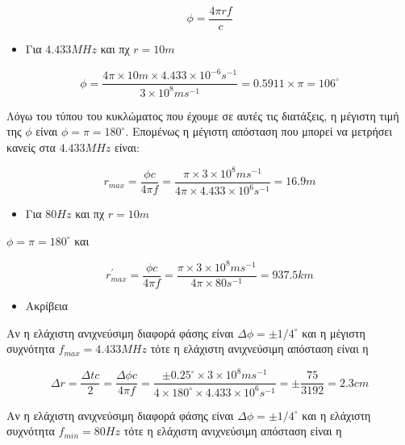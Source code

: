 \documentclass[a4paper,11pt,titlepage]{article}
\newcommand{\degrees}{^{\circ}}
\begin{document}
\begin{equation}
 \phi= \frac{4\pi rf}{c}
\end{equation}

\begin{itemize}
 \item Για $4.433MHz$ και πχ $r=10m$
\end{itemize}

\begin{equation}
 \phi=\frac{4\pi \times10m \times 4.433\times10^{-6}s^{-1}}{3\times10^8ms^{-1}}=0.5911\times\pi=106\degrees
\end{equation}

Λόγω του τύπου του κυκλώματος που έχουμε σε αυτές τις διατάξεις, η μέγιστη τιμή της $\phi$ είναι $\phi=\pi=180\degrees$. Επομένως η μέγιστη απόσταση που μπορεί να μετρήσει κανείς στα $4.433MHz$ είναι:

\begin{equation}
 r_{max}=\frac{\phi c}{4\pi f}=\frac{\pi\times 3\times10^8ms^{-1}}{4\pi\times 4.433\times10^{6} s^{-1}}=16.9m
\end{equation}

\begin{itemize}
 \item Για $80Hz$ και πχ $r=10m$
\end{itemize}

$\phi=\pi=180\degrees$ και 

\begin{equation}
 r^{'}_{max}=\frac{\phi c}{4\pi f}=\frac{\pi\times 3\times10^8ms^{-1}}{4\pi\times 80s^{-1}}=937.5 km
\end{equation}

\begin{itemize}
 \item Ακρίβεια
\end{itemize}

Αν η ελάχιστη ανιχνεύσιμη διαφορά φάσης είναι $\Delta\phi=\pm1/4\degrees$ και η μέγιστη συχνότητα $f_{max}=4.433MHz$ τότε η ελάχιστη ανιχνεύσιμη απόσταση είναι η 

\begin{equation}
 \Delta r=\frac{\Delta tc}{2}=\frac{\Delta\phi c}{4\pi f}=\frac{\pm 0.25\degrees\times 3\times10^8ms^{-1}}{4\times 180\degrees \times 4.433\times10^6s^{-1}}=\pm\frac{75}{3192}=2.3cm
\end{equation}

Αν η ελάχιστη ανιχνεύσιμη διαφορά φάσης είναι $\Delta\phi=\pm1/4\degrees$ και η ελάχιστη συχνότητα $f_{min}=80Hz$ τότε η ελάχιστη ανιχνεύσιμη απόσταση είναι η 
\end{document}
